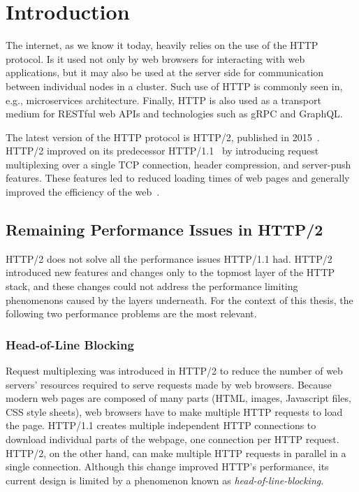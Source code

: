 \chapter{Introduction}

The internet, as we know it today, heavily relies on the use of the HTTP protocol. Is it used not
only by web browsers for interacting with web applications, but it may also be used at the server
side for communication between individual nodes in a cluster. Such use of HTTP is commonly seen in,
e.g., microservices architecture. Finally, HTTP is also used as a transport medium for RESTful web
APIs and technologies such as gRPC and GraphQL\@.

The latest version of the HTTP protocol is HTTP/2, published in 2015~\cite{rfc7540}. HTTP/2 improved
on its predecessor HTTP/1.1~\cite{rfc7230} by introducing request multiplexing over a single TCP
connection, header compression, and server-push features. These features led to reduced loading
times of web pages and generally improved the efficiency of the web~\cite{deSaxce2015}.

\section{Remaining Performance Issues in HTTP/2}

HTTP/2 does not solve all the performance issues HTTP/1.1 had. HTTP/2 introduced new features and
changes only to the topmost layer of the HTTP stack, and these changes could not address the
performance limiting phenomenons caused by the layers underneath. For the context of this thesis,
the following two performance problems are the most relevant.

\subsection*{Head-of-Line Blocking}

Request multiplexing was introduced in HTTP/2 to reduce the number of web servers' resources
required to serve requests made by web browsers. Because modern web pages are composed of many parts
(HTML, images, Javascript files, CSS style sheets), web browsers have to make multiple HTTP requests
to load the page. HTTP/1.1 creates multiple independent HTTP connections to download individual
parts of the webpage, one connection per HTTP request. HTTP/2, on the other hand, can make multiple
HTTP requests in parallel in a single connection. Although this change improved HTTP's performance,
its current design is limited by a phenomenon known as \textit{\gls{head-of-line-blocking}}.

